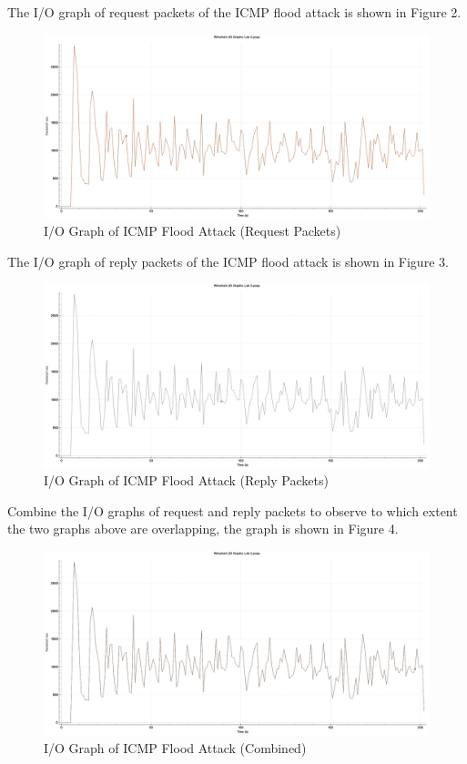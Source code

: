 \documentclass{article}
\begin{document}
    The I/O graph of request packets of the ICMP flood attack is shown in Figure 2.

    \begin{figure}[H]
        \centering
        \includegraphics[width=\textwidth]{image/131_icmp.png}
        \caption{I/O Graph of ICMP Flood Attack (Request Packets)}
        \label{fig:icmp-flood-io-graph-request}
    \end{figure}

    The I/O graph of reply packets of the ICMP flood attack is shown in Figure 3.

    \begin{figure}[H]
        \centering
        \includegraphics[width=\textwidth]{image/56_icmp.png}
        \caption{I/O Graph of ICMP Flood Attack (Reply Packets)}
        \label{fig:icmp-flood-io-graph-reply}
    \end{figure}

    Combine the I/O graphs of request and reply packets to observe to which extent the two graphs above are overlapping,
    the graph is shown in Figure 4.

    \begin{figure}[H]
        \centering
        \includegraphics[width=\textwidth]{image/131_56_icmp.png}
        \caption{I/O Graph of ICMP Flood Attack (Combined)}
        \label{fig:icmp-flood-io-graph-combine}
    \end{figure}
\end{document}
